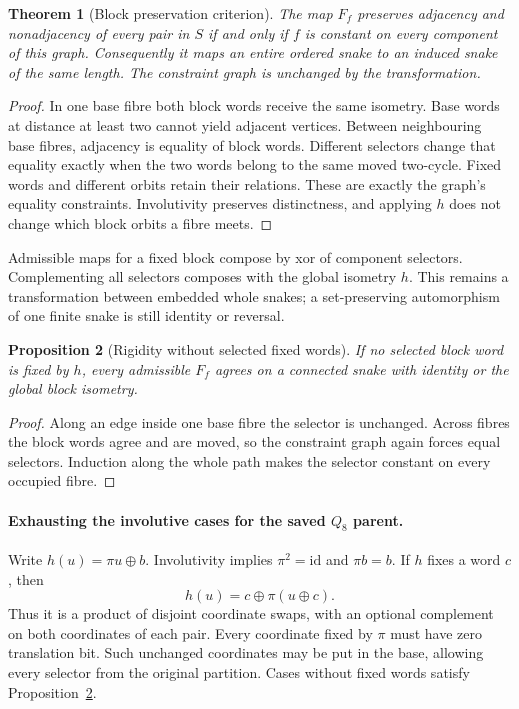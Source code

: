 \documentclass[11pt,a4paper]{article}
\newtheorem{theorem}{Theorem}[section]
\newtheorem{proposition}[theorem]{Proposition}
\theoremstyle{definition}
\theoremstyle{remark}
\begin{document}
\begin{theorem}[Block preservation criterion]
\label{thm:block203}
The map $F_f$ preserves adjacency and nonadjacency of every pair in
$S$ if and only if $f$ is constant on every component of this graph.
Consequently it maps an entire ordered snake to an induced snake of
the same length. The constraint graph is unchanged by the transformation.
\end{theorem}
\begin{proof}
In one base fibre both block words receive the same isometry. Base
words at distance at least two cannot yield adjacent vertices.
Between neighbouring base fibres, adjacency is equality of block
words. Different selectors change that equality exactly when the two
words belong to the same moved two-cycle. Fixed words and different
orbits retain their relations. These are exactly the graph's equality
constraints. Involutivity preserves distinctness, and applying $h$
does not change which block orbits a fibre meets.
\end{proof}

Admissible maps for a fixed block compose by xor of component selectors.
Complementing all selectors composes with the global isometry $h$.
This remains a transformation between embedded whole snakes; a
set-preserving automorphism of one finite snake is still identity
or reversal.

\begin{proposition}[Rigidity without selected fixed words]
\label{prop:block-rigid203}
If no selected block word is fixed by $h$, every admissible $F_f$
agrees on a connected snake with identity or the global block isometry.
\end{proposition}
\begin{proof}
Along an edge inside one base fibre the selector is unchanged.
Across fibres the block words agree and are moved, so the constraint
graph again forces equal selectors. Induction along the whole path
makes the selector constant on every occupied fibre.
\end{proof}

\paragraph{Exhausting the involutive cases for the saved $Q_8$ parent.}
Write $h(u)=\pi u\oplus b$. Involutivity implies $\pi^2=\mathrm{id}$
and $\pi b=b$. If $h$ fixes a word $c$, then
\[
h(u)=c\oplus\pi(u\oplus c).
\]
Thus it is a product of disjoint coordinate swaps, with an optional
complement on both coordinates of each pair. Every coordinate fixed
by $\pi$ must have zero translation bit. Such unchanged coordinates
may be put in the base, allowing every selector from the original
partition. Cases without fixed words satisfy
Proposition~\ref{prop:block-rigid203}.
\end{document}
